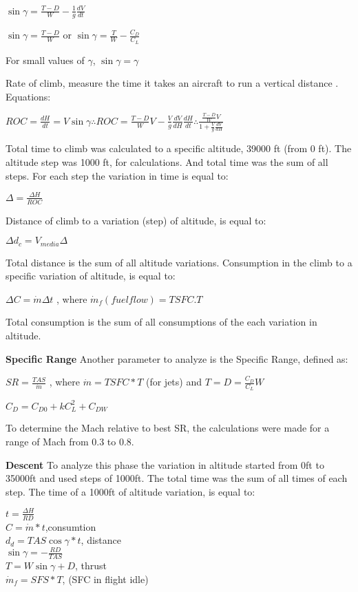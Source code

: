 $\sin\gamma = \frac{T-D}{W} - \frac{1}{g}\frac{dV}{dt}$

$\sin\gamma = \frac{T-D}{W}$ or $\sin\gamma = \frac{T}{W} - \frac{C_{D}}{C_{L}}$

For small values of $\gamma$, $\sin\gamma = \gamma$

Rate of climb, measure the time it takes an aircraft to run a vertical distance . Equations:


$ROC = \frac{dH}{dt} = V\sin\gamma \therefore ROC = \frac{T-D}{W}V - \frac{V}{g}\frac{dV}{dH}\frac{dH}{dt} \therefore \frac{ \frac{T-D}{W}V   }{ 1 + \frac{V}{g}\frac{dV}{dH} }$


Total time to climb was calculated to a specific altitude, 39000 ft (from 0 ft). The altitude step was 1000 ft, for calculations. And total time was the sum of all steps. For each step the variation in time is equal to:

$\Delta = \frac{\Delta H}{ROC}$

Distance of climb to a variation (step) of altitude, is equal to:

$ \Delta d_{c} = V_{media} \Delta$

Total distance is the sum of all altitude variations.
	Consumption in the climb to a specific variation of altitude, is equal to:

$ \Delta C = \dot{m} \Delta t$ , where $ \dot{m}_{f} (fuel flow) = TSFC.T $

Total consumption is the sum of all consumptions of the each variation in altitude.



\textbf{Specific Range}
Another parameter to analyze is the Specific Range, defined as:

$SR = \frac{TAS}{\dot{m}}$ , where $\dot{m} = TSFC*T$ (for jets) and $ T = D = \frac{C_{D}}{C_{L}}W$

$C_{D} = C_{D0} + kC_{L}^{2}+C_{DW}$

To determine the Mach relative to best SR, the calculations were made for a range of Mach from 0.3 to 0.8.

\textbf{Descent}
	To analyze this phase the variation in altitude started from 0ft to 35000ft and used steps of 1000ft. The total time was the sum of all times of each step. The time of a 1000ft of altitude variation, is equal to:

$t = \frac{\Delta H}{RD}$\\
$ C = \dot{m}*t$,consumtion\\
$d_{d} = TAS\cos \gamma*t$, distance\\
$\sin \gamma = - \frac{RD}{TAS}$\\
$T = W \sin \gamma + D$, thrust\\
$\dot{m}_{f} = SFS*T$, (SFC in flight idle)


